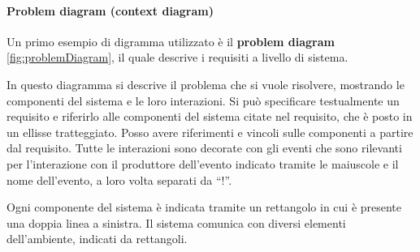 \paragraph{Problem diagram (context diagram)}
Un primo esempio di digramma utilizzato è il \textbf{problem diagram}
\ref{fig:problemDiagram}, il quale descrive i requisiti a livello di sistema.

In questo diagramma si descrive il problema che si vuole risolvere, mostrando le
componenti del sistema e le loro interazioni. Si può specificare testualmente un
requisito e riferirlo alle componenti del sistema citate nel requisito, che è
posto in un ellisse tratteggiato. Posso avere riferimenti e vincoli sulle
componenti a partire dal requisito. Tutte le interazioni sono decorate con gli
eventi che sono rilevanti per l'interazione con il produttore dell'evento indicato
tramite le maiuscole e il nome dell'evento, a loro volta separati da “!”.

Ogni componente del sistema è indicata tramite un rettangolo in cui è presente
una doppia linea a sinistra. Il sistema comunica con diversi elementi
dell'ambiente, indicati da rettangoli.

